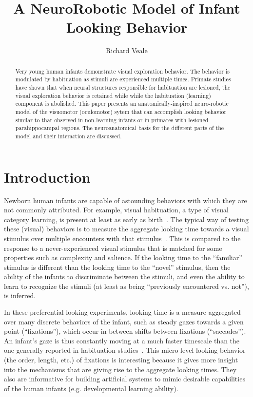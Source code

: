 \documentclass[12pt]{article}
\begin{document}
\title{A NeuroRobotic Model of Infant Looking Behavior}

\author{Richard Veale}


\maketitle

\begin{abstract}
Very young human infants demonstrate visual exploration behavior. The
behavior is modulated by habituation as stimuli are experienced
multiple times. Primate studies have shown that when neural structures
responsible for habituation are lesioned, the visual exploration
behavior is retained while while the habituation (learning) component
is abolished. This paper presents an anatomically-inspired
neuro-robotic model of the visuomotor (oculomotor) sytem that can
accomplish looking behavior similar to that observed in non-learning
infants or in primates with lesioned parahippocampal regions. The
neuroanatomical basis for the different parts of the model and their
interaction are discussed.
\end{abstract}

\section{Introduction}
Newborn human infants are capable of astounding behaviors with which
they are not commonly attributed. For example, visual habituation, a
type of visual category learning, is present at least as early as
birth~\cite{slater_morison_rose_1984}. The typical way of testing
these (visual) behaviors is to measure the aggregate looking time
towards a visual stimulus over multiple encounters with that
stimulus~\cite{fantz_1964_seminal_habit}. This is compared to the
response to a never-experienced visual stimulus that is matched for
some properties such as complexity and salience. If the looking time
to the ``familiar'' stimulus is different than the looking time to the
``novel'' stimulus, then the ability of the infants to discriminate
between the stimuli, and even the ability to learn to recognize the
stimuli (at least as being ``previously encountered vs. not''), is
inferred.

In these preferential looking experiments, looking time is a measure
aggregated over many discrete behaviors of the infant, such as steady
gazes towards a given point (``fixations''), which occur in between
shifts between fixations (``saccades''). An infant's gaze is thus
constantly moving at a much faster timescale than the one generally
reported in habituation
studies~\cite{bronson_1990_infantscanning}. This micro-level looking
behavior (the order, length, etc.) of fixations is interesting because
it gives more insight into the mechanisms that are giving rise to the
aggregate looking times. They also are informative for building
artificial systems to mimic desirable capabilities of the human
infants (e.g. developmental learning ability).
\end{document}
